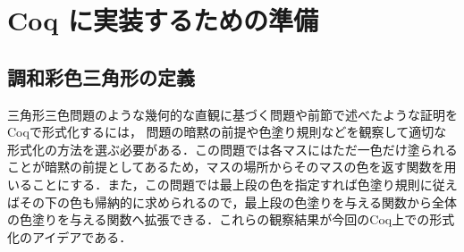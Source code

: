 \section{ Coq に実装するための準備}
\subsection{調和彩色三角形の定義}
三角形三色問題のような幾何的な直観に基づく問題や前節で述べたような証明をCoqで形式化するには，{\color{red} 問題の暗黙の前提や色塗り規則などを観察して適切な形式化の方法を選ぶ必要がある．この問題では各マスにはただ一色だけ塗られることが暗黙の前提としてあるため，マスの場所からそのマスの色を返す関数を用いることにする．また，この問題では最上段の色を指定すれば色塗り規則に従えばその下の色も帰納的に求められるので，最上段の色塗りを与える関数から全体の色塗りを与える関数へ拡張できる．これらの観察結果が今回のCoq上での形式化のアイデアである．}

